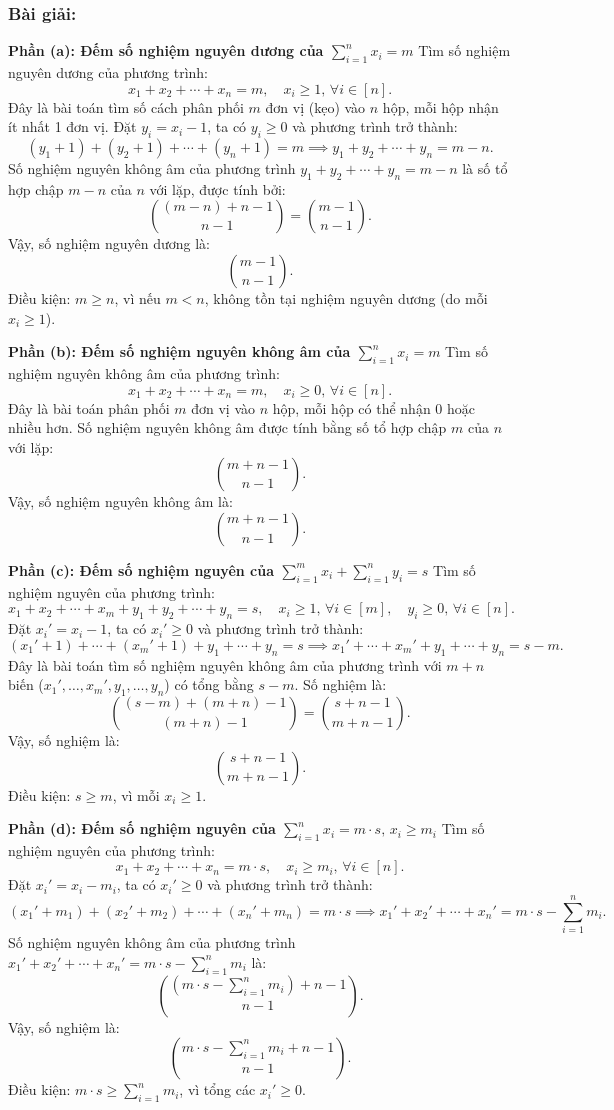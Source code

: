 \documentclass[a4paper,12pt]{article}
\begin{document}
\subsubsection*{Bài giải:}
\textbf{Phần (a): Đếm số nghiệm nguyên dương của \(\sum_{i=1}^{n} x_i = m\)}
Tìm số nghiệm nguyên dương của phương trình:
\[
x_1 + x_2 + \cdots + x_n = m, \quad x_i \geq 1, \, \forall i \in [n].
\]
Đây là bài toán tìm số cách phân phối \( m \) đơn vị (kẹo) vào \( n \) hộp, mỗi hộp nhận ít nhất 1 đơn vị. Đặt \( y_i = x_i - 1 \), ta có \( y_i \geq 0 \) và phương trình trở thành:
\[
(y_1 + 1) + (y_2 + 1) + \cdots + (y_n + 1) = m \implies y_1 + y_2 + \cdots + y_n = m - n.
\]
Số nghiệm nguyên không âm của phương trình \( y_1 + y_2 + \cdots + y_n = m - n \) là số tổ hợp chập \( m - n \) của \( n \) với lặp, được tính bởi:
\[
\binom{(m - n) + n - 1}{n - 1} = \binom{m - 1}{n - 1}.
\]
Vậy, số nghiệm nguyên dương là:
\[
\boxed{\binom{m - 1}{n - 1}}.
\]
Điều kiện: \( m \geq n \), vì nếu \( m < n \), không tồn tại nghiệm nguyên dương (do mỗi \( x_i \geq 1 \)).

\textbf{Phần (b): Đếm số nghiệm nguyên không âm của \(\sum_{i=1}^{n} x_i = m\)}
Tìm số nghiệm nguyên không âm của phương trình:
\[
x_1 + x_2 + \cdots + x_n = m, \quad x_i \geq 0, \, \forall i \in [n].
\]
Đây là bài toán phân phối \( m \) đơn vị vào \( n \) hộp, mỗi hộp có thể nhận 0 hoặc nhiều hơn. Số nghiệm nguyên không âm được tính bằng số tổ hợp chập \( m \) của \( n \) với lặp:
\[
\binom{m + n - 1}{n - 1}.
\]
Vậy, số nghiệm nguyên không âm là:
\[
\boxed{\binom{m + n - 1}{n - 1}}.
\]

\textbf{Phần (c): Đếm số nghiệm nguyên của \(\sum_{i=1}^{m} x_i + \sum_{i=1}^{n} y_i = s\)}
Tìm số nghiệm nguyên của phương trình:
\[
x_1 + x_2 + \cdots + x_m + y_1 + y_2 + \cdots + y_n = s, \quad x_i \geq 1, \, \forall i \in [m], \quad y_i \geq 0, \, \forall i \in [n].
\]
Đặt \( x_i' = x_i - 1 \), ta có \( x_i' \geq 0 \) và phương trình trở thành:
\[
(x_1' + 1) + \cdots + (x_m' + 1) + y_1 + \cdots + y_n = s \implies x_1' + \cdots + x_m' + y_1 + \cdots + y_n = s - m.
\]
Đây là bài toán tìm số nghiệm nguyên không âm của phương trình với \( m + n \) biến (\( x_1', \ldots, x_m', y_1, \ldots, y_n \)) có tổng bằng \( s - m \). Số nghiệm là:
\[
\binom{(s - m) + (m + n) - 1}{(m + n) - 1} = \binom{s + n - 1}{m + n - 1}.
\]
Vậy, số nghiệm là:
\[
\boxed{\binom{s + n - 1}{m + n - 1}}.
\]
Điều kiện: \( s \geq m \), vì mỗi \( x_i \geq 1 \).

\textbf{Phần (d): Đếm số nghiệm nguyên của \(\sum_{i=1}^{n} x_i = m \cdot s, \, x_i \geq m_i\)}
Tìm số nghiệm nguyên của phương trình:
\[
x_1 + x_2 + \cdots + x_n = m \cdot s, \quad x_i \geq m_i, \, \forall i \in [n].
\]
Đặt \( x_i' = x_i - m_i \), ta có \( x_i' \geq 0 \) và phương trình trở thành:
\[
(x_1' + m_1) + (x_2' + m_2) + \cdots + (x_n' + m_n) = m \cdot s \implies x_1' + x_2' + \cdots + x_n' = m \cdot s - \sum_{i=1}^n m_i.
\]
Số nghiệm nguyên không âm của phương trình \( x_1' + x_2' + \cdots + x_n' = m \cdot s - \sum_{i=1}^n m_i \) là:
\[
\binom{(m \cdot s - \sum_{i=1}^n m_i) + n - 1}{n - 1}.
\]
Vậy, số nghiệm là:
\[
\boxed{\binom{m \cdot s - \sum_{i=1}^n m_i + n - 1}{n - 1}}.
\]
Điều kiện: \( m \cdot s \geq \sum_{i=1}^n m_i \), vì tổng các \( x_i' \geq 0 \).
\end{document}
